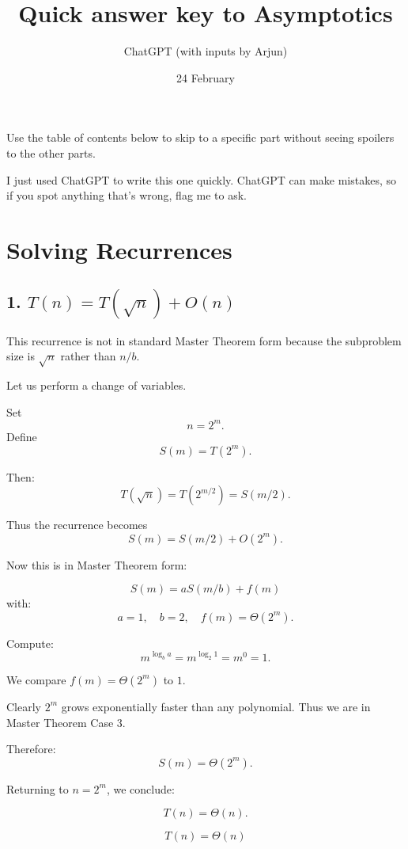 \documentclass[11pt]{article}
\begin{document}
\title{Quick answer key to Asymptotics}
\author{ChatGPT (with inputs by Arjun)}
\date{24 February}
\maketitle

Use the table of contents below to skip to a specific part
without seeing spoilers to the other parts.

I just used ChatGPT to write this one quickly.
ChatGPT can make mistakes, so if you spot anything that's wrong, flag me to ask.

\tableofcontents



\newpage


\section{Solving Recurrences}

\subsection{1. $T(n) = T(\sqrt{n}) + O(n)$}

This recurrence is not in standard Master Theorem form because the subproblem size is $\sqrt{n}$ rather than $n/b$.

Let us perform a change of variables.

Set
\[
n = 2^m.
\]
Define
\[
S(m) = T(2^m).
\]

Then:
\[
T(\sqrt{n}) = T(2^{m/2}) = S(m/2).
\]

Thus the recurrence becomes
\[
S(m) = S(m/2) + O(2^m).
\]

Now this is in Master Theorem form:

\[
S(m) = aS(m/b) + f(m)
\]
with:
\[
a=1, \quad b=2, \quad f(m)=\Theta(2^m).
\]

Compute:
\[
m^{\log_b a} = m^{\log_2 1} = m^0 = 1.
\]

We compare $f(m)=\Theta(2^m)$ to $1$.

Clearly $2^m$ grows exponentially faster than any polynomial. Thus we are in Master Theorem Case 3.

Therefore:
\[
S(m) = \Theta(2^m).
\]

Returning to $n=2^m$, we conclude:

\[
T(n) = \Theta(n).
\]

\[
\boxed{T(n)=\Theta(n)}
\]
\end{document}

